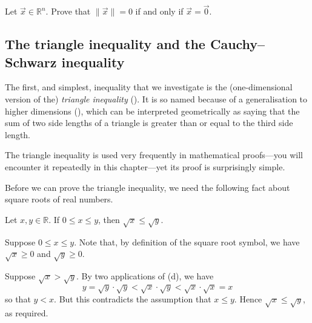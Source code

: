 \begin{exercise}
\label{exVectorZeroIffMagnitudeZero}
Let $\vec x \in \mathbb{R}^n$. Prove that $\lVert \vec x \rVert = 0$ if and only if $\vec x = \vec 0$.
\end{exercise}

\subsection*{The triangle inequality and the Cauchy--Schwarz inequality}

The first, and simplest, inequality that we investigate is the (one-dimensional version of the) \textit{triangle inequality} (). It is so named because of a generalisation to higher dimensions (), which can be interpreted geometrically as saying that the sum of two side lengths of a triangle is greater than or equal to the third side length.

The triangle inequality is used very frequently in mathematical proofs---you will encounter it repeatedly in this chapter---yet its proof is surprisingly simple.

Before we can prove the triangle inequality, we need the following fact about square roots of real numbers.

\begin{lemma}
\label{lemSquareRootIsOrderPreserving}
Let $x,y \in \mathbb{R}$. If $0 \le x \le y$, then $\sqrt{x} \le \sqrt{y}$.
\end{lemma}
\begin{cproof}
Suppose $0 \le x \le y$. Note that, by definition of the square root symbol, we have $\sqrt{x} \ge 0$ and $\sqrt{y} \ge 0$.

Suppose $\sqrt{x} > \sqrt{y}$. By two applications of (d), we have
\[ y = \sqrt{y} \cdot \sqrt{y} < \sqrt{x} \cdot \sqrt{y} < \sqrt{x} \cdot \sqrt{x} = x \]
so that $y<x$. But this contradicts the assumption that $x \le y$. Hence $\sqrt{x} \le \sqrt{y}$, as required.
\end{cproof}

